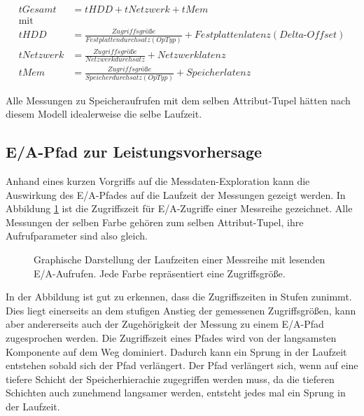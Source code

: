 \documentclass[
	12pt,
	a4paper,
	BCOR10mm,
	DIV14,
	listof=totoc,
	bibliography=totoc,
	headsepline
]{scrreprt}
\begin{document}
\begin{align*}
tGesamt &= tHDD + tNetzwerk + tMem\\
\text{mit}\\
tHDD &= \frac{Zugriffsgrö\text{ß}e}{Festplattendurchsatz(OpTyp)} + Festplattenlatenz(Delta\text{-}Offset) \\
tNetzwerk &= \frac{Zugriffsgrö\text{ß}e}{Netzwerkdurchsatz} + Netzwerklatenz\\
tMem &= \frac{Zugriffsgrö\text{ß}e}{Speicherdurchsatz(OpTyp)} + Speicherlatenz
\end{align*}

Alle Messungen zu Speicheraufrufen mit dem selben Attribut-Tupel hätten nach diesem Modell idealerweise die selbe Laufzeit.

\subsection{E/A-Pfad zur Leistungsvorhersage}
Anhand eines kurzen Vorgriffs auf die Messdaten-Exploration kann die Auswirkung des E/A-Pfades auf die Laufzeit der Messungen gezeigt werden.
In Abbildung \ref{pfad_for_vorhersage} ist die Zugriffszeit für E/A-Zugriffe einer Messreihe gezeichnet. Alle Messungen der selben Farbe gehören zum selben Attribut-Tupel, ihre Aufrufparameter sind also gleich.
\begin{figure}
	\begin{center}
		\caption{Graphische Darstellung der Laufzeiten einer Messreihe mit lesenden E/A-Aufrufen. Jede Farbe repräsentiert eine Zugriffsgröße.}
	\end{center}
	\label{pfad_for_vorhersage}
\end{figure}
In der Abbildung ist gut zu erkennen, dass die Zugriffszeiten in Stufen zunimmt.
Dies liegt einerseits an dem stufigen Anstieg der gemessenen Zugriffsgrößen, kann aber andererseits auch der Zugehörigkeit der Messung zu einem E/A-Pfad zugesprochen werden.
Die Zugriffszeit eines Pfades wird von der langsamsten Komponente auf dem Weg dominiert.
Dadurch kann ein Sprung in der Laufzeit entstehen sobald sich der Pfad verlängert. Der Pfad verlängert sich, wenn auf eine tiefere Schicht der Speicherhierachie zugegriffen werden muss, da die tieferen Schichten auch zunehmend langsamer werden, entsteht jedes mal ein Sprung in der Laufzeit.  
\medskip
\end{document}
